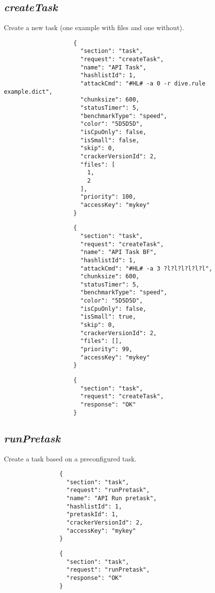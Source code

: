 \documentclass{article}
\begin{document}
			\subsection*{\textit{createTask}}
				Create a new task (one example with files and one without).
				{
					\color{blue}
					\begin{verbatim}
					{
					  "section": "task",
					  "request": "createTask",
					  "name": "API Task",
					  "hashlistId": 1,
					  "attackCmd": "#HL# -a 0 -r dive.rule example.dict",
					  "chunksize": 600,
					  "statusTimer": 5,
					  "benchmarkType": "speed",
					  "color": "5D5D5D",
					  "isCpuOnly": false,
					  "isSmall": false,
					  "skip": 0,
					  "crackerVersionId": 2,
					  "files": [
					    1,
					    2
					  ],
					  "priority": 100,
					  "accessKey": "mykey"
					}
					\end{verbatim}
				}
				{
					\color{blue}
					\begin{verbatim}
					{
					  "section": "task",
					  "request": "createTask",
					  "name": "API Task BF",
					  "hashlistId": 1,
					  "attackCmd": "#HL# -a 3 ?l?l?l?l?l?l",
					  "chunksize": 600,
					  "statusTimer": 5,
					  "benchmarkType": "speed",
					  "color": "5D5D5D",
					  "isCpuOnly": false,
					  "isSmall": true,
					  "skip": 0,
					  "crackerVersionId": 2,
					  "files": [],
					  "priority": 99,
					  "accessKey": "mykey"
					}
					\end{verbatim}
				}
				{
					\color{OliveGreen}
					\begin{verbatim}
					{
					  "section": "task",
					  "request": "createTask",
					  "response": "OK"
					}
					\end{verbatim}
				}
		\subsection*{\textit{runPretask}}
			Create a task based on a preconfigured task.
			{
				\color{blue}
				\begin{verbatim}
				{
				  "section": "task",
				  "request": "runPretask",
				  "name": "API Run pretask",
				  "hashlistId": 1,
				  "pretaskId": 1,
				  "crackerVersionId": 2,
				  "accessKey": "mykey"
				}
				\end{verbatim}
			}
			{
				\color{OliveGreen}
				\begin{verbatim}
				{
				  "section": "task",
				  "request": "runPretask",
				  "response": "OK"
				}
				\end{verbatim}
			}		
\end{document}
